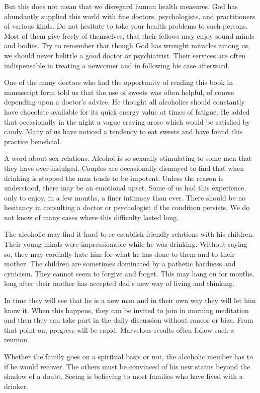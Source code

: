 \begin{biblechapter}
But this does not mean that we disregard human health measures.  God has abundantly supplied this world with fine doctors, psychologists, and practitioners of various kinds.  Do not hesitate to take your health problems to such persons.  Most of them give freely of themselves, that their fellows may enjoy sound minds and bodies.  Try to remember that though God has wrought miracles among us, we should never belittle a good doctor or psychiatrist.  Their services are often indispensable in treating a newcomer and in following his case afterward.

One of the many doctors who had the opportunity of reading this book in manuscript form told us that the use of sweets was often helpful, of course depending upon a doctor's advice.  He thought all alcoholics should constantly have chocolate available for its quick energy value at times of fatigue.  He added that occasionally in the night a vague craving arose which would be satisfied by candy.  Many of us have noticed a tendency to eat sweets and have found this practice beneficial.

A word about sex relations.  Alcohol is so sexually stimulating to some men that they have over-indulged.  Couples are occasionally dismayed to find that when drinking is stopped the man tends to be impotent.  Unless the reason is understood, there may be an emotional upset.  Some of us had this experience, only to enjoy, in a few months, a finer intimacy than ever.  There should be no hesitancy in consulting a doctor or psychologist if the condition persists.  We do not know of many cases where this difficulty lasted long.

The alcoholic may find it hard to re-establish friendly relations with his children.  Their young minds were impressionable while he was drinking.  Without saying so, they may cordially hate him for what he has done to them and to their mother.  The children are sometimes dominated by a pathetic hardness and cynicism.  They cannot seem to forgive and forget. This may hang on for months, long after their mother has accepted dad's new way of living and thinking.

In time they will see that he is a new man and in their own way they will let him know it.  When this happens, they can be invited to join in morning meditation and then they can take part in the daily discussion without rancor or bias.  From that point on, progress will be rapid.  Marvelous results often follow such a reunion.

Whether the family goes on a spiritual basis or not, the alcoholic member has to if he would recover.  The others must be convinced of his new status beyond the shadow of a doubt.  Seeing is believing to most families who have lived with a drinker.


\end{biblechapter}
